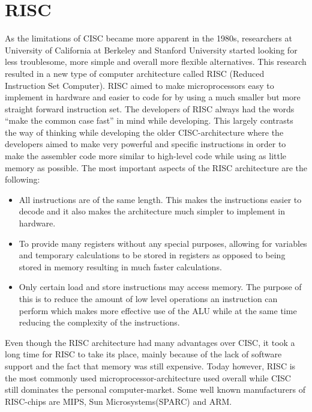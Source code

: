 \documentclass[11pt,twoside]{eitExjobb}
\begin{document}
\section{RISC}
As the limitations of CISC became more apparent in the 1980s, researchers at University of California at Berkeley and Stanford University started looking for less troublesome, more simple and overall more flexible alternatives. This research resulted in a new type of computer architecture called RISC (Reduced Instruction Set Computer). RISC aimed to make microprocessors easy to implement in hardware and easier to code for by using a much smaller but more straight forward instruction set. The developers of RISC always had the words ``make the common case fast'' in mind while developing. This largely contrasts the way of thinking while developing the older CISC-architecture where the developers aimed to make very powerful and specific instructions in order to make the assembler code more similar to high-level code while using as little memory as possible. The most important aspects of the RISC architecture are the following:

\begin{itemize}
\item{All instructions are of the same length. This makes the instructions easier to decode and it also makes the architecture much simpler to implement in hardware.}
\item{To provide many registers without any special purposes, allowing for variables and temporary calculations to be stored in registers as opposed to being stored in memory resulting in much faster calculations.}
\item{Only certain load and store instructions may access memory. The purpose of this is to reduce the amount of low level operations an instruction can perform which makes more effective use of the ALU while at the same time reducing the complexity of the instructions.}
\end{itemize}

\noindent Even though the RISC architecture had many advantages over CISC, it took a long time for RISC to take its place, mainly because of the lack of software support and the fact that memory was still expensive. Today however, RISC is the most commonly used microprocessor-architecture used overall while CISC still dominates the personal computer-market. Some well known manufacturers of RISC-chips are MIPS, Sun Microsystems(SPARC) and ARM.\cite{datorteknik}
\end{document}
